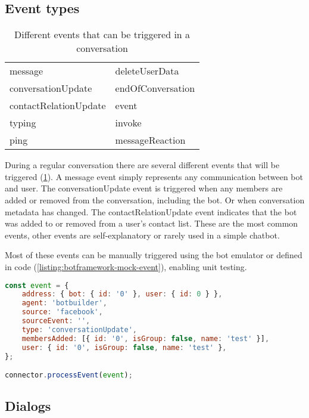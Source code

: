 \subsection{Event types}

\renewcommand{\arraystretch}{1}
\begin{table}[ht]
	\centering
	\begin{tabular}{|l|l|}
		\hline
		message               & deleteUserData    \\
		conversationUpdate    & endOfConversation \\
		contactRelationUpdate & event             \\
		typing                & invoke            \\
		ping                  & messageReaction   \\
		\hline
	\end{tabular}
	\caption{Different events that can be triggered in a conversation}
	\label{tab:events}
\end{table}

During a regular conversation there are several different events that will be triggered (\ref{tab:events}). A message event simply represents any communication between bot and user. The conversationUpdate event is triggered when any members are added or removed from the conversation, including the bot. Or when conversation metadata has changed. The contactRelationUpdate event indicates that the bot was added to or removed from a user's contact list.
These are the most common events, other events are self-explanatory or rarely used in a simple chatbot.

Most of these events can be manually triggered using the bot emulator or defined in code (\ref{listing:botframework-mock-event}), enabling unit testing.

\begin{lstlisting}[language=JavaScript,caption={Sending a mock event to the bot},label=listing:botframework-mock-event]
const event = {
	address: { bot: { id: '0' }, user: { id: 0 } },
	agent: 'botbuilder',
	source: 'facebook',
	sourceEvent: '',
	type: 'conversationUpdate',
	membersAdded: [{ id: '0', isGroup: false, name: 'test' }],
	user: { id: '0', isGroup: false, name: 'test' },
};

connector.processEvent(event);
\end{lstlisting}

\subsection{Dialogs}

